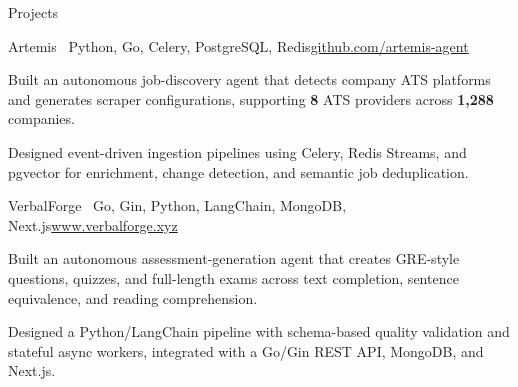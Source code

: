 \begin{rSection}{Projects}
    \begin{rSubsection}{Artemis \textbar\ Python, Go, Celery, PostgreSQL, Redis}{\href{https://github.com/artemis-agent}{github.com/artemis-agent}}{}{}
        \item Built an autonomous job-discovery agent that detects company ATS platforms and generates scraper configurations, supporting \textbf{8} ATS providers across \textbf{1,288} companies.
        \item Designed event-driven ingestion pipelines using Celery, Redis Streams, and pgvector for enrichment, change detection, and semantic job deduplication.
    \end{rSubsection}

    \begin{rSubsection}{VerbalForge \textbar\ Go, Gin, Python, LangChain, MongoDB, Next.js}{\href{https://www.verbalforge.xyz}{www.verbalforge.xyz}}{}{}
        \item Built an autonomous assessment-generation agent that creates GRE-style questions, quizzes, and full-length exams across text completion, sentence equivalence, and reading comprehension.
        \item Designed a Python/LangChain pipeline with schema-based quality validation and stateful async workers, integrated with a Go/Gin REST API, MongoDB, and Next.js.
    \end{rSubsection}
\end{rSection}
